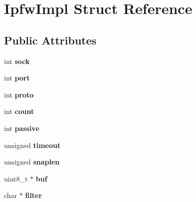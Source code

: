 \hypertarget{struct_ipfw_impl}{
\section{IpfwImpl Struct Reference}
\label{struct_ipfw_impl}
}
\subsection*{Public Attributes}
\begin{DoxyCompactItemize}
\item 
\hypertarget{struct_ipfw_impl_ace75d6ace19a6d683346c0eb21450ccb}{
int {\bfseries sock}}
\label{struct_ipfw_impl_ace75d6ace19a6d683346c0eb21450ccb}

\item 
\hypertarget{struct_ipfw_impl_a7141ff8644059f5b56f2d063d389fd3f}{
int {\bfseries port}}
\label{struct_ipfw_impl_a7141ff8644059f5b56f2d063d389fd3f}

\item 
\hypertarget{struct_ipfw_impl_a9850ccd0500130ab657d32adf64b1e71}{
int {\bfseries proto}}
\label{struct_ipfw_impl_a9850ccd0500130ab657d32adf64b1e71}

\item 
\hypertarget{struct_ipfw_impl_acd7e350374bbcc3f00b8806ff3fab927}{
int {\bfseries count}}
\label{struct_ipfw_impl_acd7e350374bbcc3f00b8806ff3fab927}

\item 
\hypertarget{struct_ipfw_impl_a6c6a3895c2a5034073d3020de0575e01}{
int {\bfseries passive}}
\label{struct_ipfw_impl_a6c6a3895c2a5034073d3020de0575e01}

\item 
\hypertarget{struct_ipfw_impl_ab06c54e1b9fcf09ac68f0651fe120346}{
unsigned {\bfseries timeout}}
\label{struct_ipfw_impl_ab06c54e1b9fcf09ac68f0651fe120346}

\item 
\hypertarget{struct_ipfw_impl_a56643db38ed3aaf1fdd4e01443621b2d}{
unsigned {\bfseries snaplen}}
\label{struct_ipfw_impl_a56643db38ed3aaf1fdd4e01443621b2d}

\item 
\hypertarget{struct_ipfw_impl_ab33843fcce07a755850652d0c2ac0e0c}{
uint8\_\-t $\ast$ {\bfseries buf}}
\label{struct_ipfw_impl_ab33843fcce07a755850652d0c2ac0e0c}

\item 
\hypertarget{struct_ipfw_impl_a5982343ac725651c3c2a3cb24a354c13}{
char $\ast$ {\bfseries filter}}
\label{struct_ipfw_impl_a5982343ac725651c3c2a3cb24a354c13}


\end{DoxyCompactItemize}

